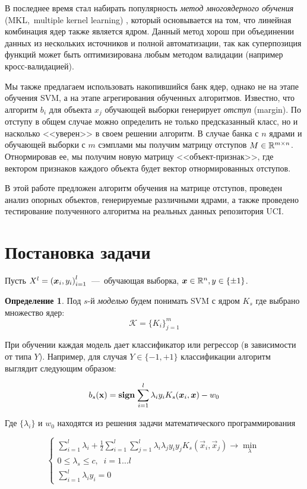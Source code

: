 \documentclass[12pt,twoside]{article}
\theoremstyle{plain}
\theoremstyle{remark}
\theoremstyle{definition}
\newtheorem{df}{Определение}[section]
\begin{document}
    В последнее время стал набирать популярность \emph{метод многоядерного обучения} (MKL,~multiple kernel learning) \cite{Dyrba2015, Bucak2014,Althloothi2014}, который основывается на том, что линейная комбинация ядер также является ядром. Данный метод хорош при объединении данных из нескольких источников и полной автоматизации, так как суперпозиция функций может быть оптимизирована любым методом валидации (например кросс-валидацией).

    Мы также предлагаем использовать накопившийся банк ядер, однако не на этапе обучения SVM, а на этапе агрегирования обученных алгоритмов. Известно, что алгоритм $b_i$ для объекта $x_j$ обучающей выборки генерирует \emph{отступ} (margin). По отступу в общем случае можно определить не только предсказанный класс, но и насколько <<уверен>> в своем решении алгоритм. В случае банка с $n$ ядрами и обучающей выборки с $m$ сэмплами
    мы получим матрицу отступов $M \in \R^{m\times n}$. Отнормировав ее, мы получим новую матрицу <<объект-признак>>, где вектором признаков каждого объекта будет вектор отнормированных отступов.

    В этой работе предложен алгоритм обучения на матрице отступов, проведен анализ опорных объектов, генерируемые различными ядрами, а также проведено тестирование полученного алгоритма на реальных данных репозитория UCI.


\section{Постановка задачи}

Пусть $X^l = \left(\boldsymbol{x}_i, y_i\right)_{i=1}^l$~---~обучающая выборка, $\boldsymbol{x}\in \mathbb{R}^n, y \in \{\pm 1\}$.

\begin{df}
	Под $s$-й \emph{моделью} будем понимать SVM с
ядром $K_s$ где выбрано множество ядер:
$$
\mathcal{K} = \{K_i\}_{j=1}^m
$$
\end{df}
	
При обучении каждая модель дает классификатор или регрессор (в зависимости от типа $Y$). Например, для случая $Y \in \{-1, +1\}$ классификации алгоритм выглядит следующим образом:

$$
b_s(\mathbf{x}) = \mathbf{sign}\;{\sum_{i=1}^l\lambda_i y_i K_s(\boldsymbol{x}_i, \boldsymbol{x}) - w_0}
$$

Где $\{\lambda_i\}$ и $w_0$ находятся из решения задачи математического программирования\cite{Smola2004}

\begin{equation*}
 \begin{cases}
   \sum_{i=1}^l \lambda_i + \frac{1}{2}\sum_{i=1}^{l}\sum_{j=1}^{l}
    \lambda_i \lambda_j y_i y_j K_s(\vec{x}_i, \vec{x}_j) \to \min_\lambda
   \\
   0 \leq \lambda_s \leq c, \;\; i = 1\ldots l
   \\
   \sum_{i=1}^l\lambda_i y_i = 0
 \end{cases}
\end{equation*}
\end{document}
